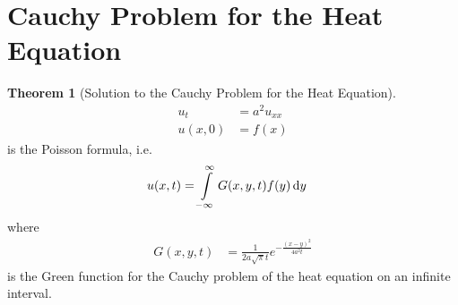 \documentclass[titlepage, fleqn, a4paper, 12pt, twoside]{article}
\theoremstyle{definition}
\theoremstyle{theorem}
\newtheorem{theorem}{Theorem}
\begin{document}
\section{Cauchy Problem for the Heat Equation}

\begin{theorem}[Solution to the Cauchy Problem for the Heat Equation]
	\begin{align*}
		u_t    & = a^2 u_{x x} \\
		u(x,0) & = f(x)
	\end{align*}
	is the Poisson formula, i.e.
	\begin{align*}
		u(x,t) & = \int\limits_{-\infty}^{\infty} G(x,y,t) f(y) \dif y
	\end{align*}
	where
	\begin{align*}
		G(x,y,t) & = \frac{1}{2 a \sqrt{\pi} t} e^{-\frac{(x - y)^2}{4 a^2 t}}
	\end{align*}
	is the Green function for the Cauchy problem of the heat equation on an infinite interval.
	\label{thm:Solution_to_the_Cauchy_Problem_for_the_Heat_Equation}
\end{theorem}
\end{document}
